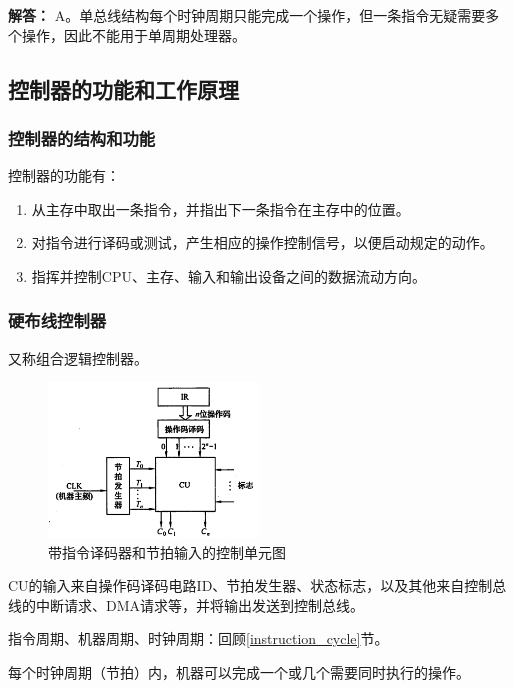 \documentclass[12pt, a4paper, oneside]{ctexart}
\newenvironment{solution}{\begin{shaded}\par\noindent\textbf{解答：}}{\end{shaded}\par}
\begin{document}
\begin{solution}
  A。单总线结构每个时钟周期只能完成一个操作，但一条指令无疑需要多个操作，因此不能用于单周期处理器。
\end{solution}

\subsection{控制器的功能和工作原理}

\subsubsection{控制器的结构和功能}

控制器的功能有：
\begin{enumerate}
  \item 从主存中取出一条指令，并指出下一条指令在主存中的位置。
  \item 对指令进行译码或测试，产生相应的操作控制信号，以便启动规定的动作。
  \item 指挥并控制CPU、主存、输入和输出设备之间的数据流动方向。
\end{enumerate}

\subsubsection{硬布线控制器}

又称组合逻辑控制器。

\begin{figure}
  \centering
  \includegraphics[width=0.5\textwidth]{./images/cu_with_id_and_clock_input.png}
  \caption{带指令译码器和节拍输入的控制单元图}
\end{figure}

CU的输入来自操作码译码电路ID、节拍发生器、状态标志，以及其他来自控制总线的中断请求、DMA请求等，并将输出发送到控制总线。

指令周期、机器周期、时钟周期：回顾\ref{instruction_cycle}节。

每个时钟周期（节拍）内，机器可以完成一个或几个需要同时执行的操作。
\end{document}
